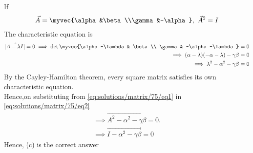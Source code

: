 If  
 \begin{align}
 \vec A = \myvec{\alpha&\beta\\\gamma&-\alpha},\
  \vec A^2 = I\label{eq:solutions/matrix/75/eq1}
 \end{align}
The characteristic equation is 
\begin{align}
    \vec{|A - \lambda I|} = 0 
    \implies \det\myvec{\alpha -\lambda & \beta \\ \gamma & -\alpha -\lambda} = 0  
    \\\implies (\alpha -\lambda)(-\alpha -\lambda)-\gamma\beta = 0
 \\\implies \lambda^2-\alpha^2-\gamma\beta = 0 \label{eq:solutions/matrix/75/eq2}
\end{align}
By the Cayley-Hamilton theorem, every square matrix satisfies its own characteristic equation.
\\Hence,on substituting from \eqref{eq:solutions/matrix/75/eq1} in \eqref{eq:solutions/matrix/75/eq2}
\begin{align}
\implies\vec{A^2-\alpha^2-\gamma\beta} =0.
\\
\implies \vec{I-\alpha^2-\gamma\beta} = 0
\end{align}
Hence, (c) is the correct answer



